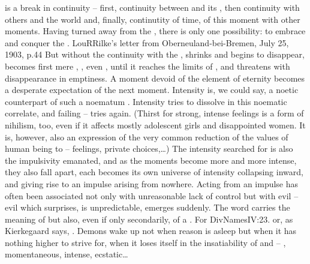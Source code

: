  is a break in continuity -- first, continuity between
 and its , then continuity with others and the world
and, finally, continutity of time, of this moment with other moments.  Having
turned away from the , there is only one possibility: to embrace
and conquer the . \citet{What is remote is no longer important, only
  yesterday; and tomorrow is more than eternity.}{LouR}{Rilke's letter from
  Oberneuland-bei-Bremen, July 25, 1903, p.44} But without the continuity with
the ,  shrinks and begins to disappear, becomes first
mere , , even , until it reaches the
limits of , and threatens with disappearance in emptiness.  A
moment devoid of the element of eternity becomes a desperate expectation of the
next moment.  Intensity is, we could say, a noetic counterpart of such a
noematum .  Intensity tries to dissolve in this noematic correlate,
and failing -- tries again.  (Thirst for strong, intense feelings is a form of
nihilism, too, even if it affects mostly adolescent girls and disappointed
women. It is, however, also an expression of the very common reduction of the
values of human being to  -- feelings, private choices,\ldots)
The intensity searched for is also the impulsivity emanated, and as the moments
become more and more intense, they also fall apart, each becomes its own
universe of intensity collapsing inward, and giving rise to an impulse arising
from nowhere.  Acting from an impulse has often been associated not only with
unreasonable lack of control but with evil -- evil which surprises, is
unpredictable, emerges suddenly. The word  carries the meaning of
 but also, even if only secondarily, of a
. For \citet{evil is
  unstable}{DivNames}{IV:23. } or, as Kierkegaard says, . Demons wake up not when reason is asleep but when it has nothing
higher to strive for, when it loses itself in the insatiability of  and
 -- , momentaneous, intense, ecstatic\ldots


